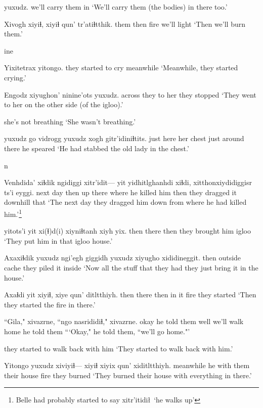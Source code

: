 \documentclass[12pt]{article}
\begin{document}
 yuxudz.
{{we'll carry them in}}
\glt  `We'll carry them (the bodies) in there too.'
\glend

\gll Xivogh xiyiɬ, xiyiɬ qun' tr'atiɬtthik.
them  {} then         fire {we'll light}
\glt `Then we'll burn them.'
\glend

ine

\gll Yixitetrax          yitongo.
{they started to cry} meanwhile
\glt `Meanwhile, they started crying.'
\glend

\gll Engodz xiyughon'   ninine'ots yuxudz.
across {they to her} {they stopped}
\glt `They went to her on the other side (of the igloo).'
\glend

{{she's not breathing}}
\glt `She wasn't breathing.'
\glend

 yuxudz go   vidrogg   yuxudz xogh gitr'idiniɬtits.
{}       just  here {her chest} just   {around there} {he speared}
\glt `He had stabbed the old lady in the chest.'
\glend 

n

\gll Venhdida' xiɬdik ngidiggi xitr'idit--- yit yidhitlghanhdi xiɬdi, xitthonxiydidiggisr    ts'i eyggi.
{next day}  then   up {} there {where he killed him} {then} {they dragged it downhill}  {}    that
\glt `The next day they dragged him down from where he had killed him.'\footnote{Belle had probably started to say xitr'itidi\l\ `he walks up'}
\glend

 yitots'i yit   xi(ɬ)d(i) xiyniɬtanh      {xiyh yix}.
{}                     then     there then  {they brought him} igloo
\glt `They put him in that igloo house.'
\glend

\gll Axaxiɬdik yuxudz ngi'egh giggidh yuxudz {xiyugho xididineggit}.
then {}              outside cache  {}        {they piled it inside}
\glt  `Now all the stuff that they had they just bring it in the house.'
\glend

\gll Axaɬdi yit xiyiɬ,  xiye qun' ditltthiyh.
then there then {in it} fire {they started}
\glt `Then they started the fire in there.'
\glend

\gll ``Gila," xivazrne,  ``ngo  nasrididiɬ,"    xivazrne.
okay  {he told them}  well {we'll walk home} {he told them}
\glt ```Okay," he told them, ``we'll go home."'
\glend

{{they started to walk back with him}}
\glt `They started to walk back with him.'
\glend

\gll Yitongo   yuxudz xiviyiɬ--- xiyiɬ         xiyix qun' xiditltthiyh.
meanwhile    {}     {}       {he with them} {their house} fire {they burned}
\glt `They burned their house with everything in there.'
\glend
\end{document}
